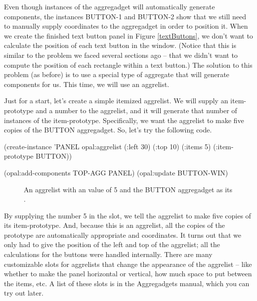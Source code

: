 Even though instances of the aggregadget will automatically generate
components, the instances BUTTON-1 and BUTTON-2 show that we still
need to manually supply coordinates to the aggregadget in order to
position it.  When we create the finished text button panel in Figure
\ref{textButtons}, we don't want to calculate the position of each
text button in the window.  (Notice that this is similar to the
problem we faced several sections ago -- that we didn't want to
compute the position of each rectangle within a text button.)  The
solution to this problem (as before) is to use a special type of
aggregate that will generate components for us.  This time, we will
use an aggrelist.

Just for a start, let's create a simple itemized aggrelist.  We will
supply an item-prototype and a number to the aggrelist, and it will
generate that number of instances of the item-prototype.
Specifically, we want the aggrelist to make five copies of the BUTTON
aggregadget.  So, let's try the following code.

\begin{programexample}
(create-instance 'PANEL opal:aggrelist
   (:left 30) (:top 10)
   (:items 5)
   (:item-prototype BUTTON))

(opal:add-components TOP-AGG PANEL)
(opal:update BUTTON-WIN)
\end{programexample}

\begin{figure}
\begin{center}
\begin{makeimage}
\end{makeimage}
\begin{latexonly}
\end{latexonly}
\end{center}
\caption{An aggrelist with an  value of 5 and the BUTTON
aggregadget as its .}
\end{figure}

By supplying the number 5 in the  slot, we tell the
aggrelist to make five copies of its item-prototype.  And, because
this is an aggrelist, all the copies of the prototype are automatically
appropriate  and  coordinates.  It turns out that
we only had to give the position of the left and top of the aggrelist;
all the calculations for the buttons were handled internally.
There are many customizable slots for aggrelists that change the
appearance of the aggrelist -- like whether to make the panel
horizontal or vertical, how much space to put between the items, etc.
A list of these slots is in the Aggregadgets manual, which you can try
out later.

